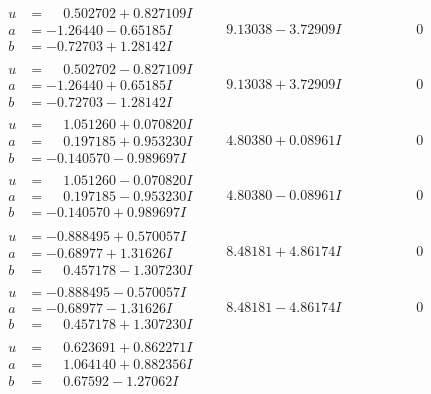 \documentclass[1p]{elsarticle_modified}
\theoremstyle{definition}
\begin{document}
$$\begin{array}{c|c|c}
\begin{aligned}
u &= \phantom{-}0.502702 + 0.827109 I \\
a &= -1.26440 - 0.65185 I \\
b &= -0.72703 + 1.28142 I\end{aligned}
 & \phantom{-}9.13038 - 3.72909 I & \phantom{-0.000000 } 0 \\ \hline\begin{aligned}
u &= \phantom{-}0.502702 - 0.827109 I \\
a &= -1.26440 + 0.65185 I \\
b &= -0.72703 - 1.28142 I\end{aligned}
 & \phantom{-}9.13038 + 3.72909 I & \phantom{-0.000000 } 0 \\ \hline\begin{aligned}
u &= \phantom{-}1.051260 + 0.070820 I \\
a &= \phantom{-}0.197185 + 0.953230 I \\
b &= -0.140570 - 0.989697 I\end{aligned}
 & \phantom{-}4.80380 + 0.08961 I & \phantom{-0.000000 } 0 \\ \hline\begin{aligned}
u &= \phantom{-}1.051260 - 0.070820 I \\
a &= \phantom{-}0.197185 - 0.953230 I \\
b &= -0.140570 + 0.989697 I\end{aligned}
 & \phantom{-}4.80380 - 0.08961 I & \phantom{-0.000000 } 0 \\ \hline\begin{aligned}
u &= -0.888495 + 0.570057 I \\
a &= -0.68977 + 1.31626 I \\
b &= \phantom{-}0.457178 - 1.307230 I\end{aligned}
 & \phantom{-}8.48181 + 4.86174 I & \phantom{-0.000000 } 0 \\ \hline\begin{aligned}
u &= -0.888495 - 0.570057 I \\
a &= -0.68977 - 1.31626 I \\
b &= \phantom{-}0.457178 + 1.307230 I\end{aligned}
 & \phantom{-}8.48181 - 4.86174 I & \phantom{-0.000000 } 0 \\ \hline\begin{aligned}
u &= \phantom{-}0.623691 + 0.862271 I \\
a &= \phantom{-}1.064140 + 0.882356 I \\
b &= \phantom{-}0.67592 - 1.27062 I\end{aligned}

\end{array}$$
\end{document}
